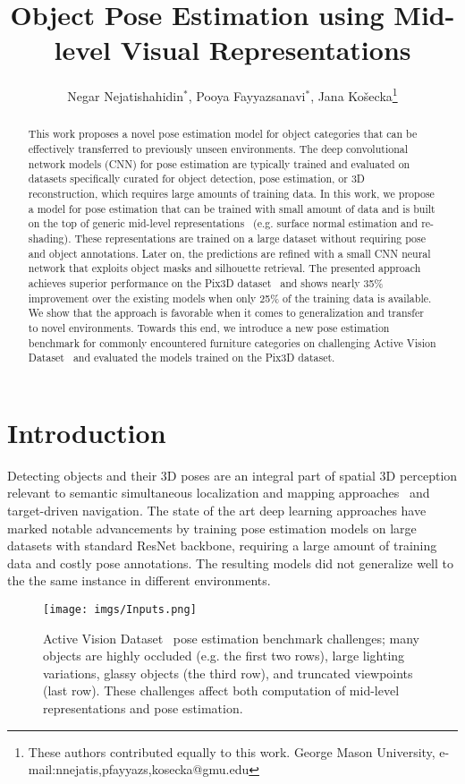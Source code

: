 \documentclass[letterpaper, 10 pt, conference]{ieeeconf}  \pdfoutput=1
\title{\LARGE \bf
Object Pose Estimation using Mid-level Visual Representations}
\author{Negar Nejatishahidin$^{*}$, Pooya Fayyazsanavi$^{*}$, Jana Ko\v{s}ecka\thanks{These authors contributed equally to this work. George Mason University, e-mail:{nnejatis,pfayyazs,kosecka}@gmu.edu}
}
\begin{document}
\maketitle
\thispagestyle{empty}
\pagestyle{empty}


\begin{abstract}
This work proposes a novel pose estimation model for object categories that can be effectively transferred to previously unseen environments.
The deep convolutional network models (CNN) for pose estimation are typically trained and evaluated on datasets specifically curated for object detection, pose estimation, or 3D reconstruction, which requires large amounts of training data. In this work, we propose a model for pose estimation that can be trained with small amount of data and is built on the top of generic mid-level
representations~\cite{taskonomy2018}  (e.g. surface normal estimation and
re-shading). These representations are trained on a large dataset without requiring pose and object annotations. Later on, the predictions are refined with a small CNN neural network that exploits object masks and silhouette retrieval. The presented approach achieves superior performance on the Pix3D dataset~\cite{pix3d} and shows nearly 35\% improvement over the existing models when only 25\% of the training data is available.  We show that the approach is favorable when it comes to generalization and transfer to novel environments. Towards this end, we introduce a new pose estimation benchmark for commonly encountered furniture categories on challenging Active Vision Dataset~\cite{Ammirato2017ADF} and evaluated the models trained on the Pix3D dataset.

\end{abstract}

\section{Introduction}
Detecting objects and their 3D poses are an integral part of spatial 3D perception relevant to 
semantic simultaneous localization and mapping approaches~\cite{SLAM++} and target-driven navigation. 
The state of the art deep learning approaches have marked notable advancements by training
pose estimation models on large datasets with standard ResNet \cite{He2016DeepRL} backbone, requiring a large amount of training data and costly pose annotations. The resulting models did not generalize well to the the same instance in different environments. 


\begin{figure}[t]
\begin{center}
\texttt{[image: imgs/Inputs.png]}
\end{center}
   \caption{Active Vision Dataset~\cite{Ammirato2017ADF} pose estimation benchmark challenges; many objects are highly occluded (e.g. the first two rows), large lighting variations, glassy objects (the third row), and truncated viewpoints (last row). These challenges affect both computation of mid-level representations and pose estimation.}
\label{AVD_sample}
\end{figure}
\end{document}
